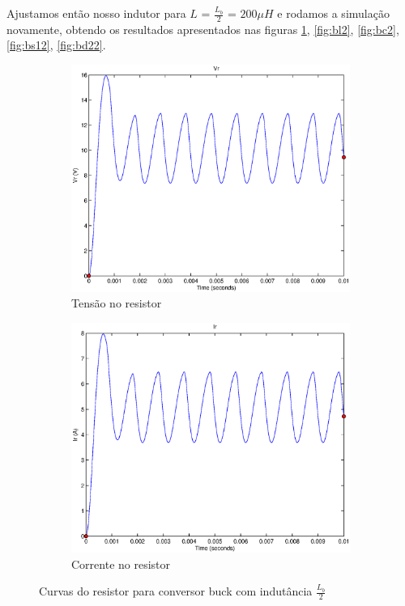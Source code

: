 \documentclass{article}
\begin{document}
Ajustamos então nosso indutor para $L$ = $\frac{L_b}{2}$ = $200 \mu H$ e rodamos a simulação novamente, obtendo os resultados apresentados nas figuras \ref{fig:br2}, \ref{fig:bl2}, \ref{fig:bc2}, \ref{fig:bs12}, \ref{fig:bd22}.

\begin{figure}[H]
	\centering
	\begin{subfigure}[b]{0.4\linewidth}
		\includegraphics[width=\linewidth]{matlab/buck/b_vr2}
		\caption{Tensão no resistor}
	\end{subfigure}
	\begin{subfigure}[b]{0.4\linewidth}
		\centering
		\includegraphics[width=\linewidth]{matlab/buck/b_ir2}
		\caption{Corrente no resistor}
	\end{subfigure}
	\caption{Curvas do resistor para conversor buck com indutância $\frac{L_b}{2}$}
	\label{fig:br2}
\end{figure}
\end{document}
